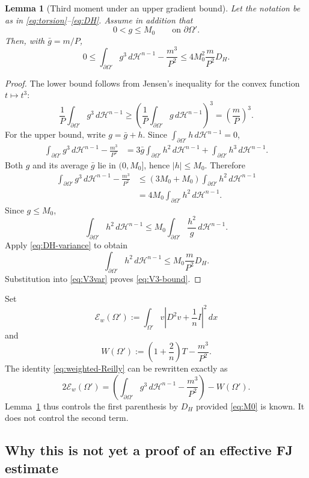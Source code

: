 \documentclass[11pt]{amsart}
\newtheorem{lemma}[theorem]{Lemma}
\theoremstyle{definition}
\newcommand{\Hn}{\mathcal H^{n-1}}
\newcommand{\Om}{\Omega}
\newcommand{\Dev}{\mathcal E}
\begin{document}
\begin{lemma}[Third moment under an upper gradient bound]\label{lem:third-moment}
Let the notation be as in \eqref{eq:torsion}--\eqref{eq:DH}.  Assume in
addition that
\[
   0<g\le M_0\qquad\text{on }\partial\Om'.
\tag{5.16}\label{eq:M0}
\]
Then, with \(\bar g=m/P\),
\[
   0\le
   \int_{\partial\Om'}g^3\,d\Hn-\frac{m^3}{P^2}
   \le
   4M_0^2\frac{m}{P^2}D_H.
\tag{5.17}\label{eq:V3-bound}
\]
\end{lemma}

\begin{proof}
The lower bound follows from Jensen's inequality for the convex function
\(t\mapsto t^3\):
\[
   \frac1P\int_{\partial\Om'}g^3\,d\Hn
   \ge\left(\frac1P\int_{\partial\Om'}g\,d\Hn\right)^3
   =\left(\frac mP\right)^3.
\]
For the upper bound, write \(g=\bar g+h\).  Since
\(\int_{\partial\Om'}h\,d\Hn=0\),
\[
\begin{aligned}
   \int_{\partial\Om'}g^3\,d\Hn-\frac{m^3}{P^2}
   &=3\bar g\int_{\partial\Om'}h^2\,d\Hn
     +\int_{\partial\Om'}h^3\,d\Hn.
\end{aligned}
\tag{5.18}\label{eq:V3expand}
\]
Both \(g\) and its average \(\bar g\) lie in \((0,M_0]\), hence
\(|h|\le M_0\).  Therefore
\[
\begin{aligned}
   \int_{\partial\Om'}g^3\,d\Hn-\frac{m^3}{P^2}
   &\le(3M_0+M_0)\int_{\partial\Om'}h^2\,d\Hn \\
   &=4M_0\int_{\partial\Om'}h^2\,d\Hn.
\end{aligned}
\tag{5.19}\label{eq:V3var}
\]
Since \(g\le M_0\),
\[
   \int_{\partial\Om'}h^2\,d\Hn
   \le
   M_0\int_{\partial\Om'}\frac{h^2}{g}\,d\Hn.
\]
Apply \eqref{eq:DH-variance} to obtain
\[
   \int_{\partial\Om'}h^2\,d\Hn
   \le M_0\frac m{P^2}D_H.
\]
Substitution into \eqref{eq:V3var} proves \eqref{eq:V3-bound}.
\end{proof}

Set
\[
   \Dev_w(\Om'):=\int_{\Om'}v\left|D^2v+\frac1nI\right|^2\,dx
\tag{5.20}\label{eq:Devw}
\]
and
\[
   W(\Om'):=
   \left(1+\frac2n\right)T-\frac{m^3}{P^2}.
\tag{5.21}\label{eq:W}
\]
The identity \eqref{eq:weighted-Reilly} can be rewritten exactly as
\[
   2\Dev_w(\Om')
   =
   \left(\int_{\partial\Om'}g^3\,d\Hn-\frac{m^3}{P^2}\right)
   -W(\Om').
\tag{5.22}\label{eq:Dev-decomp}
\]
Lemma~\ref{lem:third-moment} thus controls the first parenthesis by \(D_H\)
provided \eqref{eq:M0} is known.  It does not control the second term.

\subsection{Why this is not yet a proof of an effective FJ estimate}
\end{document}
